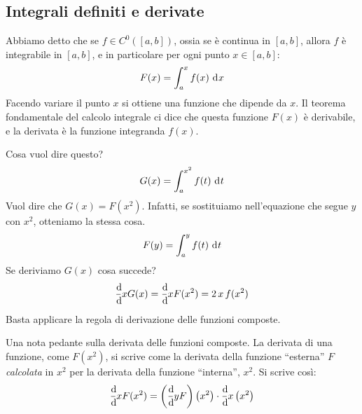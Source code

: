 \subsection{Integrali definiti e derivate}
\label{derivate_di_integrali}

Abbiamo detto che se $f \in C^0 ([a,b])$, ossia se \`e continua in $[a,b]$, allora $f$ \`e integrabile in $[a,b]$, e in particolare per ogni punto $x \in [a,b]$:
\[
F(x) = \int_{a}^{x} f(x) \dx
\]
Facendo variare il punto $x$ si ottiene una funzione che dipende da $x$. Il teorema fondamentale del calcolo integrale ci dice che questa funzione $F(x)$ \`e derivabile, e la derivata \`e la funzione integranda $f(x)$.

Cosa vuol dire questo?
\[
G(x) = \int_{a}^{x^2} f(t) \dx[t]
\]
Vuol dire che $G(x) = F(x^2)$. Infatti, se sostituiamo nell'equazione che segue $y$ con $x^2$, otteniamo la stessa cosa.
\[
F(y) = \int_{a}^{y} f(t) \dx[t]
\]
Se deriviamo $G(x)$ cosa succede?
\[
\deriv{x} G(x) = \deriv{x} F(x^2) = 2 \, x \, f(x^2)
\]
Basta applicare la regola di derivazione delle funzioni composte.

Una nota pedante sulla derivata delle funzioni composte. La derivata di una funzione, come $F(x^2)$, si scrive come la derivata della funzione ``esterna'' $F$ \emph{calcolata} in $x^2$ per la derivata della funzione ``interna'', $x^2$. Si scrive cos\`i:
\[
\deriv{x} F(x^2) = \left( \deriv{y} F \right) \left( x^2 \right) \cdot \deriv{x} \left( x^2 \right)
\]

